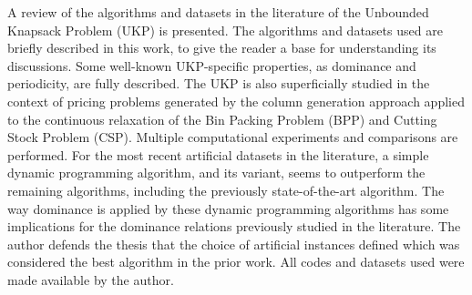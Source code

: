 A review of the algorithms and datasets in the literature of the Unbounded Knapsack Problem (UKP) is presented.
The algorithms and datasets used are briefly described in this work, to give the reader a base for understanding its discussions.
Some well-known UKP-specific properties, as dominance and periodicity, are fully described.
The UKP is also superficially studied in the context of pricing problems generated by the column generation approach applied to the continuous relaxation of the Bin Packing Problem (BPP) and Cutting Stock Problem (CSP).
Multiple computational experiments and comparisons are performed.
For the most recent artificial datasets in the literature, a simple dynamic programming algorithm, and its variant, seems to outperform the remaining algorithms, including the previously state-of-the-art algorithm.
The way dominance is applied by these dynamic programming algorithms has some implications for the dominance relations previously studied in the literature.
The author defends the thesis that the choice of artificial instances defined which was considered the best algorithm in the prior work.
All codes and datasets used were made available by the author.
